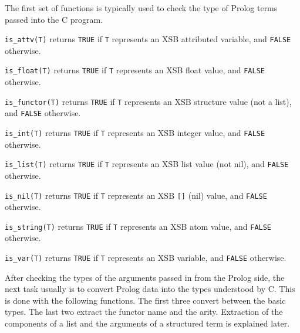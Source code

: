 The first set of functions is typically used to check the type of
Prolog terms passed into the C program. %
\begin{description}
 
    {\tt is\_attv(T)} returns {\tt TRUE} if {\tt T} represents an XSB
    attributed variable,  and {\tt FALSE} otherwise.

 
    {\tt is\_float(T)} returns {\tt TRUE} if {\tt T} represents an XSB
    float value, and {\tt FALSE} otherwise.

 
    {\tt is\_functor(T)} returns {\tt TRUE} if {\tt T} represents an
    XSB structure value (not a list), and {\tt FALSE} otherwise.

 
    {\tt is\_int(T)} returns {\tt TRUE} if {\tt T} represents an XSB
    integer value, and {\tt FALSE} otherwise.

 
    {\tt is\_list(T)} returns {\tt TRUE} if {\tt T} represents an
    XSB list value (not nil), and {\tt FALSE} otherwise.

 
    {\tt is\_nil(T)} returns {\tt TRUE} if {\tt T} represents an XSB
    \verb|[]| (nil) value, and {\tt FALSE} otherwise.

 
    {\tt is\_string(T)} returns {\tt TRUE} if {\tt T} represents an XSB
    atom value, and {\tt FALSE} otherwise.

 
    {\tt is\_var(T)} returns {\tt TRUE} if {\tt T} represents an XSB
    variable, and {\tt FALSE} otherwise.

\end{description}

After checking the types of the arguments passed in from the Prolog side,
the next task usually is to convert Prolog data into the types understood
by C.  This is done with the following functions. The first three convert
between the basic types. The last two extract the functor name and the
arity.  Extraction of the components of a list and the arguments of a
structured term is explained later.

